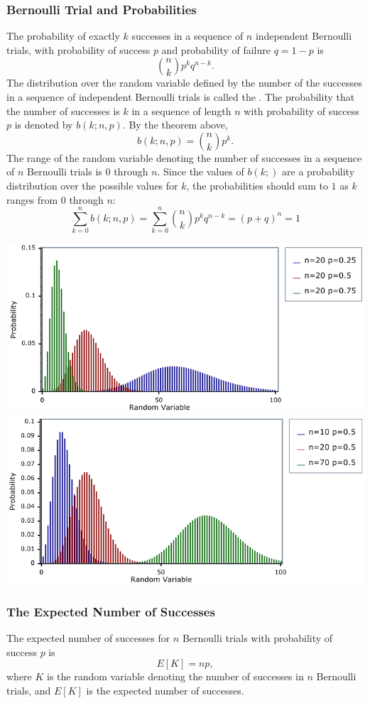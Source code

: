 \subsubsection*{Bernoulli Trial and Probabilities}
The probability of exactly $k$ successes in a sequence of $n$ independent Bernoulli trials, with probability of success $p$ and probability of failure $q=1-p$ is
\[
  \binom{n}{k}p^kq^{n-k}.
\]
The distribution over the random variable defined by the number of the successes in a sequence of independent Bernoulli trials is called the . The probability that the number of successes is $k$ in a sequence of length $n$ with probability of success $p$ is denoted by $b(k;n,p)$. By the theorem above,
\[
  b(k;n,p) = \binom{n}{k}p^k.
\]
The range of the random variable denoting the number of successes in a sequence of $n$ Bernoulli trials is 0 through $n$. Since the values of $b(k;)$ are a probability distribution over the possible values for $k$, the probabilities should sum to $1$ as $k$ ranges from $0$ through $n$:
\[
  \sum_{k=0}^{n} b(k;n,p) = \sum_{k=0}^{n} \binom{n}{k} p^kq^{n-k} = (p+q)^n = 1
\]
\begin{center}
  \includegraphics[width=.49\linewidth]{resources/negative_binomial_pdf_1.png}
  \includegraphics[width=.49\linewidth]{resources/negative_binomial_pdf_2.png}
\end{center}

\subsubsection*{The Expected Number of Successes}
The expected number of successes for $n$ Bernoulli trials with probability of success $p$ is
\[
  E[K] = np,
\]
where $K$ is the random variable denoting the number of successes in $n$ Bernoulli trials, and $E[K]$ is the expected number of successes.